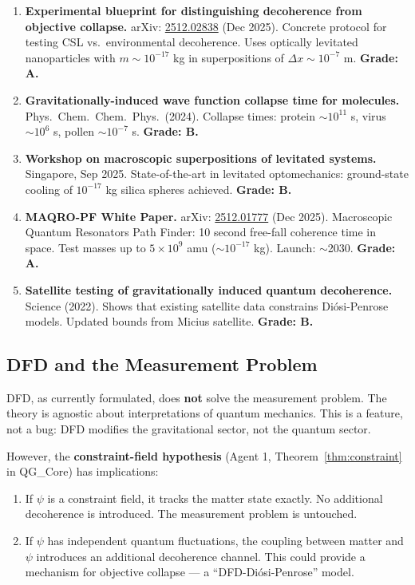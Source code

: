 \documentclass[11pt,a4paper]{article}
\begin{document}
\begin{enumerate}
\item \textbf{Experimental blueprint for distinguishing decoherence from objective collapse.} arXiv: \href{https://arxiv.org/abs/2512.02838}{2512.02838} (Dec 2025). Concrete protocol for testing CSL vs.\ environmental decoherence. Uses optically levitated nanoparticles with $m \sim 10^{-17}$ kg in superpositions of $\Delta x \sim 10^{-7}$ m. \textbf{Grade: A.}

\item \textbf{Gravitationally-induced wave function collapse time for molecules.} Phys.\ Chem.\ Chem.\ Phys.\ (2024). Collapse times: protein $\sim 10^{11}$ s, virus $\sim 10^6$ s, pollen $\sim 10^{-7}$ s. \textbf{Grade: B.}

\item \textbf{Workshop on macroscopic superpositions of levitated systems.} Singapore, Sep 2025. State-of-the-art in levitated optomechanics: ground-state cooling of $10^{-17}$ kg silica spheres achieved. \textbf{Grade: B.}

\item \textbf{MAQRO-PF White Paper.} arXiv: \href{https://arxiv.org/abs/2512.01777}{2512.01777} (Dec 2025). Macroscopic Quantum Resonators Path Finder: 10 second free-fall coherence time in space. Test masses up to $5\times 10^9$ amu ($\sim 10^{-17}$ kg). Launch: $\sim$2030. \textbf{Grade: A.}

\item \textbf{Satellite testing of gravitationally induced quantum decoherence.} Science (2022). Shows that existing satellite data constrains Di\'{o}si-Penrose models. Updated bounds from Micius satellite. \textbf{Grade: B.}
\end{enumerate}

\subsection{DFD and the Measurement Problem}
\label{sec:measurement}

DFD, as currently formulated, does \textbf{not} solve the measurement problem. The theory is agnostic about interpretations of quantum mechanics. This is a feature, not a bug: DFD modifies the gravitational sector, not the quantum sector.

However, the \textbf{constraint-field hypothesis} (Agent 1, Theorem~\ref{thm:constraint} in QG\_Core) has implications:

\begin{enumerate}
\item If $\psi$ is a constraint field, it tracks the matter state exactly. No additional decoherence is introduced. The measurement problem is untouched.

\item If $\psi$ has independent quantum fluctuations, the coupling between matter and $\psi$ introduces an additional decoherence channel. This could provide a mechanism for objective collapse --- a ``DFD-Di\'{o}si-Penrose'' model.
\end{enumerate}
\end{document}
